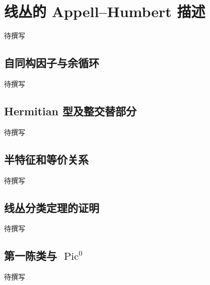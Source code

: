 
% 
% 

\section{线丛的 Appell–Humbert 描述}
\label{g4:sec:2102}

待撰写

\subsection{自同构因子与余循环}
\label{g4:subsec:2102:01}
待撰写

\subsection{Hermitian 型及整交替部分}
\label{g4:subsec:2102:02}
待撰写

\subsection{半特征和等价关系}
\label{g4:subsec:2102:03}
待撰写

\subsection{线丛分类定理的证明}
\label{g4:subsec:2102:04}
待撰写

\subsection{\texorpdfstring{第一陈类与 \(\operatorname{Pic}^0\)}{第一陈类与 Pic⁰}}
\label{g4:subsec:2102:05}
待撰写
